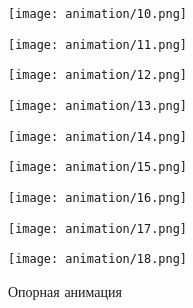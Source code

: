 \begin{figure}
\begin{minipage}{0.326\textwidth}
    \centering
    \texttt{[image: animation/10.png]}
  \end{minipage}
  \begin{minipage}{0.326\textwidth}
    \centering
    \texttt{[image: animation/11.png]}
  \end{minipage}
  \begin{minipage}{0.326\textwidth}
    \centering
    \texttt{[image: animation/12.png]}
  \end{minipage}
  \vfill
  \hfill
  \begin{minipage}{0.326\textwidth}
    \centering
    \texttt{[image: animation/13.png]}
  \end{minipage}
  \begin{minipage}{0.326\textwidth}
    \centering
    \texttt{[image: animation/14.png]}
  \end{minipage}
  \begin{minipage}{0.326\textwidth}
    \centering
    \texttt{[image: animation/15.png]}
  \end{minipage}
  \vfill
  \hfill
  \begin{minipage}{0.326\textwidth}
    \centering
    \texttt{[image: animation/16.png]}
  \end{minipage}
  \begin{minipage}{0.326\textwidth}
    \centering
    \texttt{[image: animation/17.png]}
  \end{minipage}
  \begin{minipage}{0.326\textwidth}
    \centering
    \texttt{[image: animation/18.png]}
  \end{minipage}
  \caption{Опорная анимация}
  \label{fig:reference}
\end{figure}

